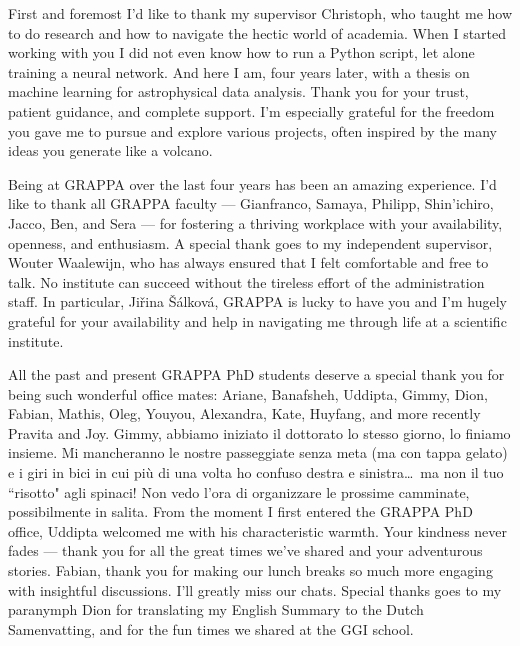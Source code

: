 
First and foremost I’d like to thank my supervisor Christoph, who taught me how to do research and how to navigate the hectic world of academia. When I started working with you I did not even know how to run a Python script, let alone training a neural network. And here I am, four years later, with a thesis on machine learning for astrophysical data analysis. Thank you for your trust, patient guidance, and complete support. I’m especially grateful for the freedom you gave me to pursue and explore various projects, often inspired by the many ideas you generate like a volcano.

Being at GRAPPA over the last four years has been an amazing experience. I'd like to thank all GRAPPA faculty --- Gianfranco, Samaya, Philipp, Shin'ichiro, Jacco, Ben, and Sera --- for fostering a thriving workplace with your availability, openness, and enthusiasm. A special thank goes to my independent supervisor, Wouter Waalewijn, who has always ensured that I felt comfortable and free to talk. No institute can succeed without the tireless effort of the administration staff. In particular, Ji\v{r}ina \v{S}\'{a}lkov\'{a}, GRAPPA is lucky to have you and I’m hugely grateful for your availability and help in navigating me through life at a scientific institute.

All the past and present GRAPPA PhD students deserve a special thank you for being such wonderful office mates: Ariane, Banafsheh, Uddipta, Gimmy, Dion, Fabian, Mathis, Oleg, Youyou, Alexandra, Kate, Huyfang, and more recently Pravita and Joy. 
Gimmy, abbiamo iniziato il dottorato lo stesso giorno, lo finiamo insieme. Mi mancheranno le nostre passeggiate senza meta (ma con tappa gelato) e i giri in bici in cui più di una volta ho confuso destra e sinistra\dots\ ma non il tuo ``risotto" agli spinaci! Non vedo l'ora di organizzare le prossime camminate, possibilmente in salita.
From the moment I first entered the GRAPPA PhD office, Uddipta welcomed me with his characteristic warmth. Your kindness never fades — thank you for all the great times we've shared and your adventurous stories.
Fabian, thank you for making our lunch breaks so much more engaging with insightful discussions. I'll greatly miss our chats.
Special thanks goes to my paranymph Dion for translating my English Summary to the Dutch Samenvatting, and for the fun times we shared at the GGI school. 

